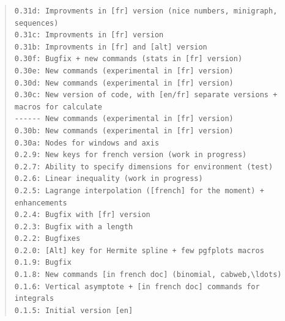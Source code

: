 \documentclass[11pt,a4paper]{ltxdoc}
\begin{document}
\begin{quote}
\begin{verbatim}
0.31d: Improvments in [fr] version (nice numbers, minigraph, sequences)
0.31c: Improvments in [fr] version
0.31b: Improvments in [fr] and [alt] version
0.30f: Bugfix + new commands (stats in [fr] version)
0.30e: New commands (experimental in [fr] version)
0.30d: New commands (experimental in [fr] version)
0.30c: New version of code, with [en/fr] separate versions + macros for calculate
------ New commands (experimental in [fr] version)
0.30b: New commands (experimental in [fr] version)
0.30a: Nodes for windows and axis
0.2.9: New keys for french version (work in progress)
0.2.7: Ability to specify dimensions for environment (test)
0.2.6: Linear inequality (work in progress)
0.2.5: Lagrange interpolation ([french] for the moment) + enhancements
0.2.4: Bugfix with [fr] version
0.2.3: Bugfix with a length
0.2.2: Bugfixes
0.2.0: [Alt] key for Hermite spline + few pgfplots macros
0.1.9: Bugfix
0.1.8: New commands [in french doc] (binomial, cabweb,\ldots)
0.1.6: Vertical asymptote + [in french doc] commands for integrals
0.1.5: Initial version [en]
\end{verbatim}
\end{quote}
\end{document}

